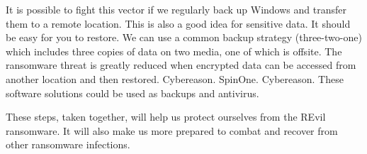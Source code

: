 It is possible to fight this vector if we regularly back up Windows and transfer them to a remote location. This is also a good idea for sensitive data. It should be easy for you to restore. We can use a common backup strategy (three-two-one) which includes three copies of data on two media, one of which is offsite. The ransomware threat is greatly reduced when encrypted data can be accessed from another location and then restored. Cybereason. SpinOne. Cybereason. These software solutions could be used as backups and antivirus.

These steps, taken together, will help us protect ourselves from the REvil ransomware. It will also make us more prepared to combat and recover from other ransomware infections.

\begingroup
    \raggedright

    
    
    
\endgroup


